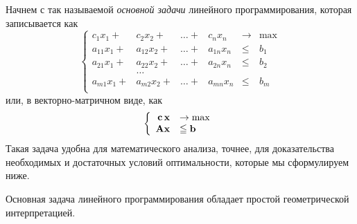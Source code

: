Начнем  с так называемой \emph{основной задачи} линейного
программирования, которая записывается как
\begin{equation} \label{OSZLP}
\left\{
\begin{array}{rrrrllll}
     c_1 x_1 + & c_2 x_2 +    & \ldots +& c_n x_n &\to & \max\\
     a_{11} x_1 + & a_{12} x_2 + &\ldots +& a_{1n} x_n &\leqslant& b_1 \\
     a_{21} x_1 + & a_{22} x_2 + &\ldots +& a_{2n} x_n &\leqslant& b_2\\
                      & \ldots &&&&\\
     a_{m1} x_1 + & a_{m2} x_2 +& \ldots +& a_{mn} x_n &\leqslant& b_m\\
    \end{array} \right.
\end{equation}
    или, в векторно-матричном виде, как
\[
    \left\{
    \begin{array}{rl}
     \mathbf{c} \, \mathbf{x} & \to \max  \\
    \mathbf{A} \mathbf{x} &\leqq \mathbf{b} \\
        \end{array} \right.
\]
    Такая задача удобна для математического анализа, точнее,
    для доказательства необходимых и достаточных условий
    оптимальности, которые мы сформулируем ниже.

    Основная задача линейного программирования обладает простой геометрической интерпретацией.





